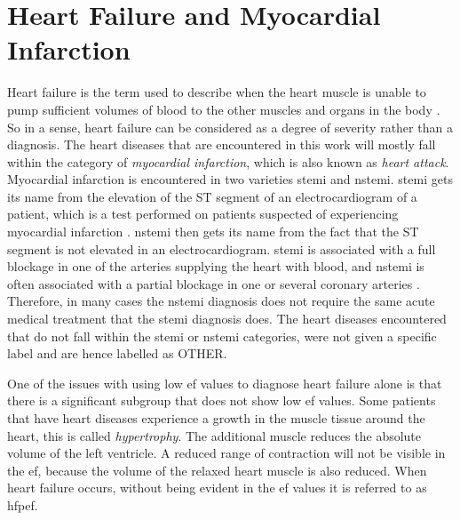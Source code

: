 \section{Heart Failure and Myocardial Infarction}

Heart failure is the term used to describe when the heart muscle is unable to pump sufficient volumes of blood to the other muscles and organs in the body \cite{medicine_net}. So in a sense, heart failure can be considered as a degree of severity rather than a diagnosis. The heart diseases that are encountered in this work will mostly fall within the category of \textit{myocardial infarction}, which is also known as \textit{heart attack}. Myocardial infarction is encountered in two varieties \acrfull{stemi} and \acrfull{nstemi}. \acrshort{stemi} gets its name from the elevation of the ST segment of an electrocardiogram of a patient, which is a test performed on patients suspected of experiencing myocardial infarction \cite{ecg_stemi}. \acrshort{nstemi} then gets its name from the fact that the ST segment is not elevated in an electrocardiogram. \acrshort{stemi} is associated with a full blockage in one of the arteries supplying the heart with blood, and \acrshort{nstemi} is often associated with a partial blockage in one or several coronary arteries \cite{ambulanseforum}. Therefore, in many cases the \acrshort{nstemi} diagnosis does not require the same acute medical treatment that the \acrshort{stemi} diagnosis does. The heart diseases encountered that do not fall within the \acrshort{stemi} or \acrshort{nstemi} categories, were not given a specific label and are hence labelled as OTHER. \bigskip

One of the issues with using low \acrshort{ef} values to diagnose heart failure alone is that there is a significant subgroup that does not show low \acrshort{ef} values. Some patients that have heart diseases experience a growth in the muscle tissue around the heart, this is called \textit{hypertrophy}. The additional muscle reduces the absolute volume of the left ventricle. A reduced range of contraction will not be visible in the \acrshort{ef}, because the volume of the relaxed heart muscle is also reduced. When heart failure occurs, without being evident in the \acrshort{ef} values it is referred to as \acrshort{hfpef}. \bigskip

